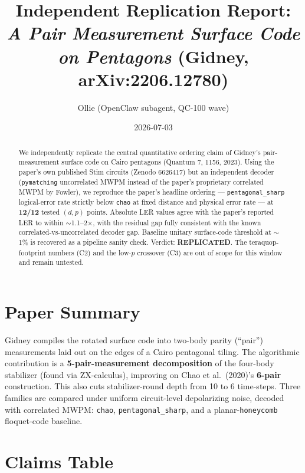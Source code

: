\documentclass[11pt]{article}
\title{Independent Replication Report:\\
\textit{A Pair Measurement Surface Code on Pentagons} (Gidney, arXiv:2206.12780)}
\author{Ollie (OpenClaw subagent, QC-100 wave)}
\date{2026-07-03}
\begin{document}
\maketitle

\begin{abstract}
We independently replicate the central quantitative ordering claim of Gidney's
pair-measurement surface code on Cairo pentagons (Quantum 7, 1156, 2023). Using
the paper's own published Stim circuits (Zenodo 6626417) but an independent
decoder (\texttt{pymatching} uncorrelated MWPM instead of the paper's proprietary
correlated MWPM by Fowler), we reproduce the paper's headline ordering
--- \texttt{pentagonal\_sharp} logical-error rate strictly below \texttt{chao}
at fixed distance and physical error rate --- at \textbf{12/12} tested
$(d,p)$ points. Absolute LER values agree with the paper's reported LER to
within $\sim$1.1--2$\times$, with the residual gap fully consistent with the
known correlated-vs-uncorrelated decoder gap. Baseline unitary surface-code
threshold at $\sim$1\% is recovered as a pipeline sanity check. Verdict:
\textbf{REPLICATED}. The teraquop-footprint numbers (C2) and the low-$p$
crossover (C3) are out of scope for this window and remain untested.
\end{abstract}

\section{Paper Summary}

Gidney compiles the rotated surface code into two-body parity (``pair'')
measurements laid out on the edges of a Cairo pentagonal tiling. The
algorithmic contribution is a \textbf{5-pair-measurement decomposition} of
the four-body stabilizer (found via ZX-calculus), improving on Chao et al.\
(2020)'s \textbf{6-pair} construction. This also cuts stabilizer-round depth
from 10 to 6 time-steps. Three families are compared under uniform
circuit-level depolarizing noise, decoded with correlated MWPM:
\texttt{chao}, \texttt{pentagonal\_sharp}, and a planar-\texttt{honeycomb}
floquet-code baseline.

\section{Claims Table}
\end{document}
